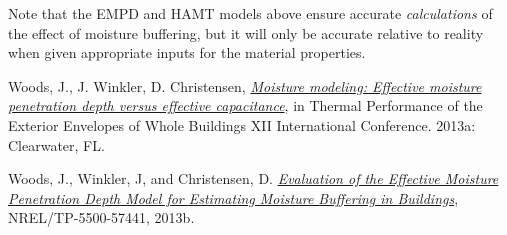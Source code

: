 Note that the EMPD and HAMT models above ensure accurate \emph{calculations} of the effect of moisture buffering, but it will only be accurate relative to reality when given appropriate inputs for the material properties.

Woods, J., J. Winkler, D. Christensen, \href{http://www.techstreet.com/products/1868073}{\emph{Moisture modeling: Effective moisture penetration depth versus effective capacitance}}, in Thermal Performance of the Exterior Envelopes of Whole Buildings XII International Conference. 2013a: Clearwater, FL.

Woods, J., Winkler, J, and Christensen, D. \href{http://www.nlr.gov/docs/fy13osti/57441.pdf}{\emph{Evaluation of the Effective Moisture Penetration Depth Model for Estimating Moisture Buffering in Buildings}}, NREL/TP-5500-57441, 2013b.
